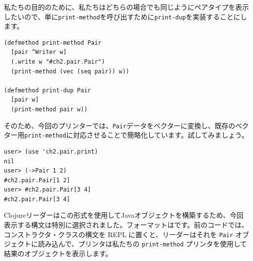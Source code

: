 私たちの目的のために、私たちはどちらの場合でも同じようにペアタイプを表示したいので、単に\texttt{print-method}を呼び出すために\texttt{print-dup}を実装することにします。

\begin{lstlisting}[numbers=none]
(defmethod print-method Pair
  [pair ^Writer w]
  (.write w "#ch2.pair.Pair")
  (print-method (vec (seq pair)) w))

(defmethod print-dup Pair
  [pair w]
  (print-method pair w))
\end{lstlisting}

そのため、今回のプリンターでは、\texttt{Pair}データをベクターに変換し、既存のベクター用\texttt{print-method}に対応させることで簡略化しています。試してみましょう。

\begin{lstlisting}[numbers=none]
user> (use 'ch2.pair.print)
nil
user> (->Pair 1 2)
#ch2.pair.Pair[1 2]
user> #ch2.pair.Pair[3 4]
#ch2.pair.Pair[3 4]
\end{lstlisting}

Clojureリーダーはこの形式を使用してJavaオブジェクトを構築するため、今回表示する構文は特別に選択されました。フォーマットはです。前のコードでは、コンストラクタ・クラスの構文を REPL に置くと、リーダーはそれを \texttt{Pair} オブジェクトに読み込んで、プリンタは私たちの \texttt{print-method} プリンタを使用して結果のオブジェクトを表示します。

